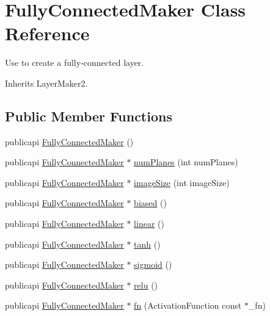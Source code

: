 \hypertarget{classFullyConnectedMaker}{\section{Fully\-Connected\-Maker Class Reference}
\label{classFullyConnectedMaker}
}


Use to create a fully-\/connected layer.  




Inherits Layer\-Maker2.

\subsection*{Public Member Functions}
\begin{DoxyCompactItemize}
\item 
publicapi \hyperlink{classFullyConnectedMaker_adead12d4a37e3c8870f3dd8b86dba6a4}{Fully\-Connected\-Maker} ()
\item 
publicapi \hyperlink{classFullyConnectedMaker}{Fully\-Connected\-Maker} $\ast$ \hyperlink{classFullyConnectedMaker_a423334ce24eefa41eed24c478c796633}{num\-Planes} (int num\-Planes)
\item 
publicapi \hyperlink{classFullyConnectedMaker}{Fully\-Connected\-Maker} $\ast$ \hyperlink{classFullyConnectedMaker_a293d6f8da3375ef878ad1c4da788b87c}{image\-Size} (int image\-Size)
\item 
publicapi \hyperlink{classFullyConnectedMaker}{Fully\-Connected\-Maker} $\ast$ \hyperlink{classFullyConnectedMaker_a720ac826099b2bd0d8bdb824c03f2f46}{biased} ()
\item 
publicapi \hyperlink{classFullyConnectedMaker}{Fully\-Connected\-Maker} $\ast$ \hyperlink{classFullyConnectedMaker_a5b5f922b7ecc5e72b1ec05eccb75dcee}{linear} ()
\item 
publicapi \hyperlink{classFullyConnectedMaker}{Fully\-Connected\-Maker} $\ast$ \hyperlink{classFullyConnectedMaker_a431952fca7b766519e3285d61db0a607}{tanh} ()
\item 
publicapi \hyperlink{classFullyConnectedMaker}{Fully\-Connected\-Maker} $\ast$ \hyperlink{classFullyConnectedMaker_a876052fa0a8ce10156b558b2f05e0ac8}{sigmoid} ()
\item 
publicapi \hyperlink{classFullyConnectedMaker}{Fully\-Connected\-Maker} $\ast$ \hyperlink{classFullyConnectedMaker_af64f70a3947429e0f3e1cc9b79e5d22e}{relu} ()
\item 
publicapi \hyperlink{classFullyConnectedMaker}{Fully\-Connected\-Maker} $\ast$ \hyperlink{classFullyConnectedMaker_abed9af0a8c0c1e808d44eaf4888e18f2}{fn} (Activation\-Function const $\ast$\-\_\-fn)
\end{DoxyCompactItemize}
